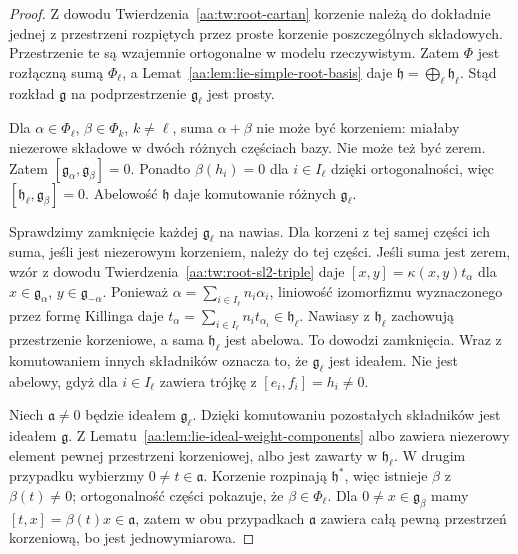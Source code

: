 \begin{proof}
Z dowodu Twierdzenia~\ref{aa:tw:root-cartan} korzenie należą do dokładnie jednej z przestrzeni rozpiętych przez proste korzenie poszczególnych składowych. Przestrzenie te są wzajemnie ortogonalne w modelu rzeczywistym. Zatem $\Phi$ jest rozłączną sumą $\Phi_\ell$, a Lemat~\ref{aa:lem:lie-simple-root-basis} daje $\mathfrak h=\bigoplus_\ell\mathfrak h_\ell$. Stąd rozkład $\mathfrak g$ na podprzestrzenie $\mathfrak g_\ell$ jest prosty.

Dla $\alpha\in\Phi_\ell$, $\beta\in\Phi_k$, $k\ne\ell$, suma $\alpha+\beta$ nie może być korzeniem: miałaby niezerowe składowe w dwóch różnych częściach bazy. Nie może też być zerem. Zatem $[\mathfrak g_\alpha,\mathfrak g_\beta]=0$. Ponadto $\beta(h_i)=0$ dla $i\in I_\ell$ dzięki ortogonalności, więc $[\mathfrak h_\ell,\mathfrak g_\beta]=0$. Abelowość $\mathfrak h$ daje komutowanie różnych $\mathfrak g_\ell$.

Sprawdzimy zamknięcie każdej $\mathfrak g_\ell$ na nawias. Dla korzeni z tej samej części ich suma, jeśli jest niezerowym korzeniem, należy do tej części. Jeśli suma jest zerem, wzór z dowodu Twierdzenia~\ref{aa:tw:root-sl2-triple} daje $[x,y]=\kappa(x,y)t_\alpha$ dla $x\in\mathfrak g_\alpha$, $y\in\mathfrak g_{-\alpha}$. Ponieważ $\alpha=\sum_{i\in I_\ell}n_i\alpha_i$, liniowość izomorfizmu wyznaczonego przez formę Killinga daje $t_\alpha=\sum_{i\in I_\ell}n_i t_{\alpha_i}\in\mathfrak h_\ell$. Nawiasy z $\mathfrak h_\ell$ zachowują przestrzenie korzeniowe, a sama $\mathfrak h_\ell$ jest abelowa. To dowodzi zamknięcia. Wraz z komutowaniem innych składników oznacza to, że $\mathfrak g_\ell$ jest ideałem. Nie jest abelowy, gdyż dla $i\in I_\ell$ zawiera trójkę z $[e_i,f_i]=h_i\ne0$.

Niech $\mathfrak a\ne0$ będzie ideałem $\mathfrak g_\ell$. Dzięki komutowaniu pozostałych składników jest ideałem $\mathfrak g$. Z Lematu~\ref{aa:lem:lie-ideal-weight-components} albo zawiera niezerowy element pewnej przestrzeni korzeniowej, albo jest zawarty w $\mathfrak h_\ell$. W drugim przypadku wybierzmy $0\ne t\in\mathfrak a$. Korzenie rozpinają $\mathfrak h^*$, więc istnieje $\beta$ z $\beta(t)\ne0$; ortogonalność części pokazuje, że $\beta\in\Phi_\ell$. Dla $0\ne x\in\mathfrak g_\beta$ mamy $[t,x]=\beta(t)x\in\mathfrak a$, zatem w obu przypadkach $\mathfrak a$ zawiera całą pewną przestrzeń korzeniową, bo jest jednowymiarowa.


\end{proof}
